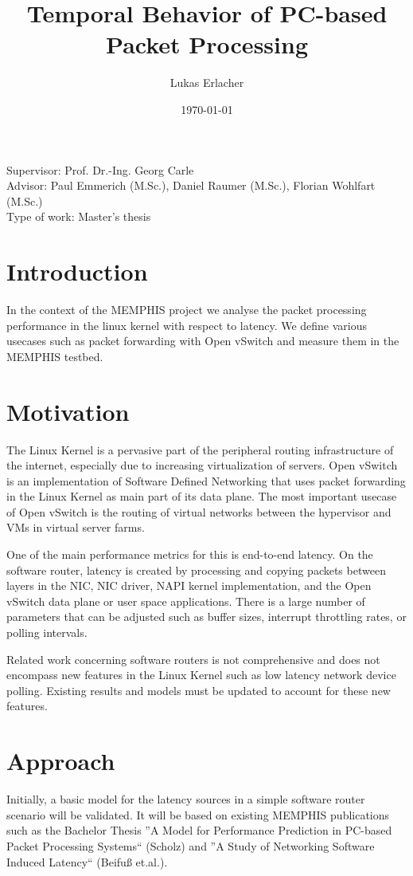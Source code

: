\documentclass[a4paper]{article}
\title{Temporal Behavior of PC-based Packet Processing}
\date{\today}
\author{Lukas Erlacher}
\begin{document}
\maketitle
\thispagestyle{fancy}

\begin{flushleft}
Supervisor: Prof. Dr.-Ing. Georg Carle\\
Advisor: Paul Emmerich (M.Sc.), Daniel Raumer (M.Sc.), Florian Wohlfart (M.Sc.)\\
Type of work: Master's thesis
\end{flushleft}


\section*{Introduction}
In the context of the MEMPHIS project we analyse the packet processing performance in the linux kernel with respect to latency. We define various usecases such as packet forwarding with Open vSwitch and measure them in the MEMPHIS testbed.


\section*{Motivation}
The Linux Kernel is a pervasive part of the peripheral routing infrastructure of the internet, especially due to increasing virtualization of servers. Open vSwitch is an implementation of Software Defined Networking that uses packet forwarding in the Linux Kernel as main part of its data plane. The most important usecase of Open vSwitch is the routing of virtual networks between the hypervisor and VMs in virtual server farms.

One of the main performance metrics for this is end-to-end latency. On the software router, latency is created by processing and copying packets between layers in the NIC, NIC driver, NAPI kernel implementation, and the Open vSwitch data plane or user space applications. There is a large number of parameters that can be adjusted such as buffer sizes, interrupt throttling rates, or polling intervals.

Related work concerning software routers is not comprehensive and does not encompass new features in the Linux Kernel such as low latency network device polling. Existing results and models must be updated to account for these new features.

\section*{Approach}
Initially, a basic model for the latency sources in a simple software router scenario will be validated. It will be based on existing MEMPHIS publications such as the Bachelor Thesis ''A Model for Performance Prediction in PC-based Packet Processing Systems`` (Scholz) and ''A Study of Networking Software Induced Latency`` (Beifuß et.al.).
\end{document}
